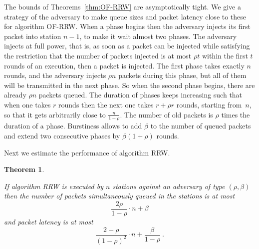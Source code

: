 \documentclass[11pt]{article}
\newtheorem{theorem}{Theorem}
\begin{document}
The bounds of Theorems~\ref{thm:OF-RRW}  are asymptotically tight. 
We give a strategy of the adversary to make queue sizes and packet latency close to these for algorithm \textsc{OF-RRW}.
When a phase begins then the adversary injects its first packet into station $n-1$, to make it wait almost two phases.
The adversary injects at full power, that is, as soon as a packet can be injected while satisfying the restriction that the number of packets injected is at most $\rho t$ within the first $t$ rounds of an execution, then a packet is injected.
The first phase takes exactly $n$ rounds, and the adversary injects $\rho n$ packets during this phase, but all of them will be transmitted in the next phase.
So when the second phase begins, there are already $\rho n$ packets queued.
The duration of phases keeps increasing such that when one takes $r$ rounds then the next one takes $r+\rho r$ rounds, starting from~$n$, so that it gets arbitrarily close to $\frac{n}{1-\rho}$.
The number of old packets is $\rho$ times the duration of a phase.
Burstiness allows to add $\beta$ to the number of queued packets and extend two consecutive phases by  $\beta(1+\rho)$ rounds. 

Next we estimate the performance of algorithm \textsc{RRW}.


\begin{theorem}
\label{thm:RRW}

If algorithm \textsc{RRW}  is executed by $n$ stations against an adversary of type $(\rho,\beta)$ then the number of packets simultaneously queued in the stations is at most
\begin{equation}
\label{eqn:RRW-queues}
\frac{2\rho }{1-\rho}\cdot n +\beta
\end{equation}
and packet latency is at most
\begin{equation}
\label{eqn:RRW-latency}
\frac{2-\rho}{(1-\rho)^2} \cdot n+ \frac{\beta}{1-\rho}
\ .
\end{equation}
\end{theorem}
\end{document}
